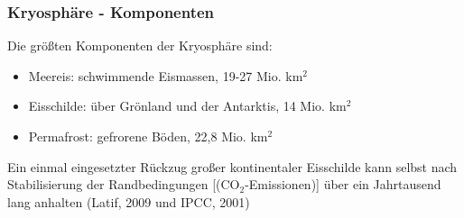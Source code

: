 \begin{frame}
	\frametitle{Kryosphäre - Komponenten}
	Die größten Komponenten der Kryosphäre sind:
	\begin{itemize}
		\item Meereis: schwimmende Eismassen, 19-27 Mio. km$^2$
		\item Eisschilde: über Grönland und der Antarktis, 14 Mio. km$^2$
		\item Permafrost: gefrorene Böden, 22,8 Mio. km$^2$
	\end{itemize}

	\glqq Ein einmal eingesetzter Rückzug großer kontinentaler Eisschilde kann selbst nach Stabilisierung der Randbedingungen [(CO$_2$-Emissionen)] über ein Jahrtausend lang anhalten\grqq{} (Latif, 2009 und IPCC, 2001)\\

\end{frame}

